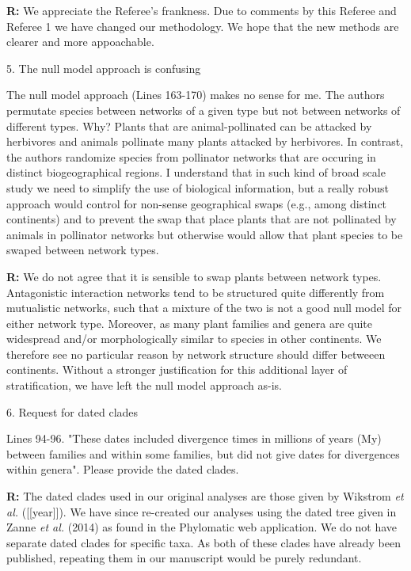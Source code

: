 \documentclass[12pt]{letter}
\newenvironment{refquote}{\bigskip \begin{it}}{\end{it}\smallskip}
\begin{document}
      \textbf{R:} We appreciate the Referee's frankness. Due to comments by this Referee and Referee 1 we have changed our methodology. We hope that the new methods are clearer and more appoachable.


  5. The null model approach is confusing

    \begin{refquote} 

      The null model approach (Lines 163-170) makes no sense for me. The authors permutate species between networks of a given type but not between networks of different types. Why? Plants that are animal-pollinated can be attacked by herbivores and animals pollinate many plants attacked by herbivores. In contrast, the authors randomize species from pollinator networks that are occuring in distinct biogeographical regions. I understand that in such kind of broad scale study we need to simplify the use of biological information, but a really robust approach would control for non-sense geographical swaps (e.g., among distinct continents) and to prevent the swap that place plants that are not pollinated by animals in pollinator networks but otherwise would allow that plant species to be swaped between network types.

      \end{refquote}

      \textbf{R:} We do not agree that it is sensible to swap plants between network types. Antagonistic interaction networks tend to be structured quite differently from mutualistic networks, such that a mixture of the two is not a good null model for either network type. Moreover, as many plant families and genera are quite widespread and/or morphologically similar to species in other continents. We therefore see no particular reason by network structure should differ betweeen continents. Without a stronger justification for this additional layer of stratification, we have left the null model approach as-is.


  6. Request for dated clades

    \begin{refquote}

      Lines 94-96. "These dates included divergence times in millions of years (My) between families and within some families, but did not give dates for divergences within genera". Please provide the dated clades.

      \end{refquote}

      \textbf{R:} The dated clades used in our original analyses are those given by Wikstrom \emph{et al.} ([[year]]). We have since re-created our analyses using the dated tree given in Zanne \emph{et al.} (2014) as found in the Phylomatic web application. We do not have separate dated clades for specific taxa. As both of these clades have already been published, repeating them in our manuscript would be purely redundant.
\end{document}
